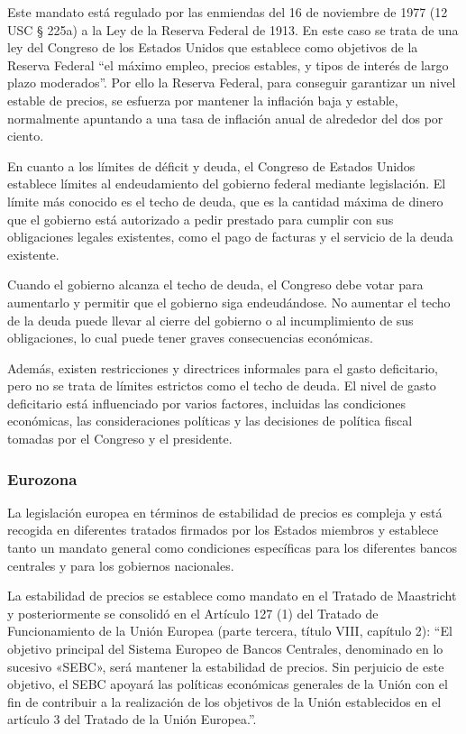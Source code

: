 \documentclass[titlepage, 12pt]{article}
\begin{document}
Este mandato está regulado por las enmiendas del 16 de noviembre de 1977 (12 USC § 225a) a la Ley de la Reserva Federal de 1913. En este caso se trata de una ley del Congreso de los Estados Unidos que establece como objetivos de la Reserva Federal \enquote{el máximo empleo, precios estables, y tipos de interés de largo plazo moderados}. Por ello la Reserva Federal, para conseguir garantizar un nivel estable de precios, se esfuerza por mantener la inflación baja y estable, normalmente apuntando a una tasa de inflación anual de alrededor del dos por ciento.

En cuanto a los límites de déficit y deuda, el Congreso de Estados Unidos establece límites al endeudamiento del gobierno federal mediante legislación. El límite más conocido es el techo de deuda, que es la cantidad máxima de dinero que el gobierno está autorizado a pedir prestado para cumplir con sus obligaciones legales existentes, como el pago de facturas y el servicio de la deuda existente.

Cuando el gobierno alcanza el techo de deuda, el Congreso debe votar para aumentarlo y permitir que el gobierno siga endeudándose. No aumentar el techo de la deuda puede llevar al cierre del gobierno o al incumplimiento de sus obligaciones, lo cual puede tener graves consecuencias económicas.

Además, existen restricciones y directrices informales para el gasto deficitario, pero no se trata de límites estrictos como el techo de deuda. El nivel de gasto deficitario está influenciado por varios factores, incluidas las condiciones económicas, las consideraciones políticas y las decisiones de política fiscal tomadas por el Congreso y el presidente.

\subsubsection{Eurozona}

La legislación europea en términos de estabilidad de precios es compleja y está recogida en diferentes tratados firmados por los Estados miembros \autocite{lemos2023} y establece tanto un mandato general como condiciones específicas para los diferentes bancos centrales y para los gobiernos nacionales.

La estabilidad de precios se establece como mandato en el Tratado de Maastricht y posteriormente se consolidó en el Artículo 127 (1) del Tratado de Funcionamiento de la Unión Europea (parte tercera, título VIII, capítulo 2): \enquote{El objetivo principal del Sistema Europeo de Bancos Centrales, denominado en lo sucesivo «SEBC», será mantener la estabilidad de precios. Sin perjuicio de este objetivo, el SEBC apoyará las políticas económicas generales de la Unión con el fin de contribuir a la realización de los objetivos de la Unión establecidos en el artículo 3 del Tratado de la Unión Europea.}.
\end{document}
